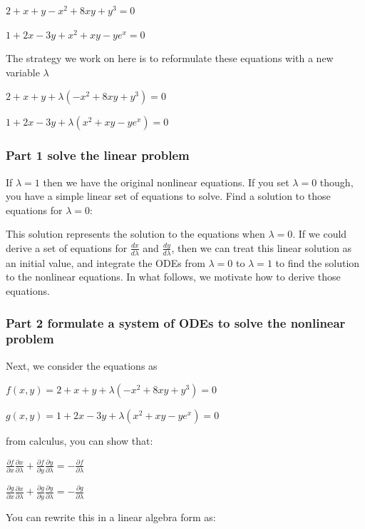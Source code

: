 \documentclass[11pt]{article}
\begin{document}
\(2 + x + y - x^2 + 8 x y + y^3 = 0\)

\(1 + 2x - 3y + x^2 + xy - y e^x = 0\)

The strategy we work on here is to reformulate these equations with a new variable \(\lambda\)

\(2 + x + y + \lambda(- x^2 + 8 x y + y^3) = 0\)

\(1 + 2x - 3y + \lambda(x^2 + xy - y e^x) = 0\)

\subsubsection{Part 1 solve the linear problem}
\label{sec:orgd7996e9}
If \(\lambda=1\) then we have the original nonlinear equations. If you set \(\lambda=0\) though, you have a simple linear set of equations to solve. Find a solution to those equations for \(\lambda=0\):

This solution represents the solution to the equations when \(\lambda=0\). If we could derive a set of equations for \(\frac{dx}{d\lambda}\) and \(\frac{dy}{d\lambda}\), then we can treat this linear solution as an initial value, and integrate the ODEs from \(\lambda=0\) to \(\lambda=1\) to find the solution to the nonlinear equations. In what follows, we motivate how to derive those equations.

\subsubsection{Part 2 formulate a system of ODEs to solve the nonlinear problem}
\label{sec:org4ba9eca}

Next, we consider the equations as

\(f(x, y) = 2 + x + y + \lambda(- x^2 + 8 x y + y^3) = 0\)

\(g(x, y) = 1 + 2x - 3y + \lambda(x^2 + xy - y e^x) = 0\)

from calculus, you can show that:

\(\frac{\partial f}{\partial x}\frac{\partial x}{\partial \lambda}+\frac{\partial f}{\partial y}\frac{\partial y}{\partial \lambda}=-\frac{\partial f}{\partial \lambda}\)

\(\frac{\partial g}{\partial x}\frac{\partial x}{\partial \lambda}+\frac{\partial g}{\partial y}\frac{\partial y}{\partial \lambda}=-\frac{\partial g}{\partial \lambda}\)

You can rewrite this in a linear algebra form as:
\end{document}
